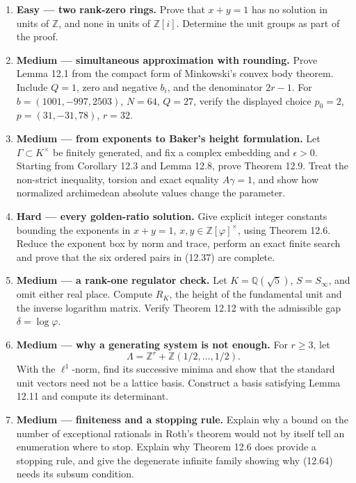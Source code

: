 \documentclass[
  11pt,
  a4paper,
]{article}
\newcounter{none} %
\begin{document}
\begin{enumerate}
\def\labelenumi{\arabic{enumi}.}
\item
  \textbf{Easy --- two rank-zero rings.} Prove that \(x+y=1\) has no
  solution in units of \(\mathbb Z\), and none in units of
  \(\mathbb Z[i]\). Determine the unit groups as part of the proof.
\item
  \textbf{Medium --- simultaneous approximation with rounding.} Prove
  Lemma 12.1 from the compact form of Minkowski's convex body theorem.
  Include \(Q=1\), zero and negative \(b_i\), and the denominator
  \(2r-1\). For \(b=(1001,-997,2503)\), \(N=64\), \(Q=27\), verify the
  displayed choice \(p_0=2\), \(p=(31,-31,78)\), \(r=32\).
\item
  \textbf{Medium --- from exponents to Baker's height formulation.} Let
  \(\Gamma\subset K^\times\) be finitely generated, and fix a complex
  embedding and \(\epsilon>0\). Starting from Corollary 12.3 and Lemma
  12.8, prove Theorem 12.9. Treat the non-strict inequality, torsion and
  exact equality \(A\gamma=1\), and show how normalized archimedean
  absolute values change the parameter.
\item
  \textbf{Hard --- every golden-ratio solution.} Give explicit integer
  constants bounding the exponents in \(x+y=1\),
  \(x,y\in\mathbb Z[\varphi]^\times\), using Theorem 12.6. Reduce the
  exponent box by norm and trace, perform an exact finite search and
  prove that the six ordered pairs in (12.37) are complete.
\item
  \textbf{Medium --- a rank-one regulator check.} Let
  \(K=\mathbb Q(\sqrt5)\), \(S=S_\infty\), and omit either real place.
  Compute \(R_K\), the height of the fundamental unit and the inverse
  logarithm matrix. Verify Theorem 12.12 with the admissible gap
  \(\delta=\log\varphi\).
\item
  \textbf{Medium --- why a generating system is not enough.} For
  \(r\ge3\), let \[
  \Lambda=\mathbb Z^r+\mathbb Z(1/2,\ldots,1/2).
  \] With the \(\ell^1\)-norm, find its successive minima and show that
  the standard unit vectors need not be a lattice basis. Construct a
  basis satisfying Lemma 12.11 and compute its determinant.
\item
  \textbf{Medium --- finiteness and a stopping rule.} Explain why a
  bound on the number of exceptional rationals in Roth's theorem would
  not by itself tell an enumeration where to stop. Explain why Theorem
  12.6 does provide a stopping rule, and give the degenerate infinite
  family showing why (12.64) needs its subsum condition.
\end{enumerate}
\end{document}
